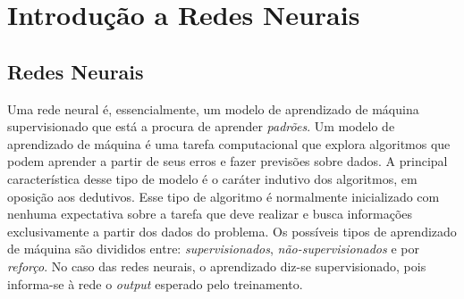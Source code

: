 \chapter{Introdução a Redes Neurais}
\label{ch:02-background}



\section{Redes Neurais}

Uma rede neural é, essencialmente, um modelo de aprendizado de máquina supervisionado %
que está a procura de aprender \textit{padrões}. Um modelo de aprendizado de máquina é uma tarefa computacional que explora algoritmos que podem aprender a partir de seus erros e fazer previsões sobre dados. A principal característica desse tipo de modelo é o caráter indutivo dos algoritmos, em oposição aos dedutivos. Esse tipo de algoritmo é normalmente inicializado com nenhuma expectativa sobre a tarefa que deve realizar e busca informações exclusivamente a partir dos dados do problema. Os possíveis tipos de aprendizado de máquina são divididos entre: \textit{supervisionados}, \textit{não-supervisionados} %
e por \textit{reforço}. %
No caso das redes neurais, o aprendizado diz-se supervisionado, pois informa-se à rede o \textit{output} esperado pelo treinamento.

